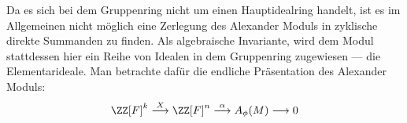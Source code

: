     	Da es sich bei dem Gruppenring nicht um einen Hauptidealring handelt, ist es im Allgemeinen nicht möglich eine Zerlegung des Alexander Moduls in zyklische direkte Summanden zu finden. Als algebraische Invariante, wird dem Modul stattdessen hier ein Reihe von Idealen in dem Gruppenring zugewiesen --- die Elementarideale. Man betrachte dafür die endliche Präsentation des Alexander Moduls:
    	\[
    		\ZZ[F]^k \stackrel{X}{\longrightarrow} \ZZ[F]^n \stackrel{\alpha}{\longrightarrow} A_\phi(M) \longrightarrow 0
    	\]



